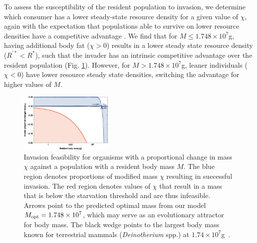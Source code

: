 \documentclass{pnastwo}
\begin{document}
\begin{article}
To assess the susceptibility of the resident population to invasion, we determine which consumer has a lower steady-state resource density for a given value of $\chi$, again with the expectation that populations able to survive on lower resource densities have a competitive advantage \cite{tilman1981}.
We find that for $M\leq 1.748\times10^7$g, having additional body fat ($\chi > 0$) results in a lower steady state resource density ($R^{\prime *}<R^*$), such that the invader has an intrinsic competitive advantage over the resident population (Fig. \ref{fig:invasion}).
However, for $M> 1.748\times10^7$g, leaner individuals ($\chi < 0$) have lower resource steady state densities, switching the advantage for higher values of $M$.



\begin{figure}
\centering
\includegraphics[width=0.4\textwidth]{fig_Invasion.eps}
\caption{\small{ Invasion feasibility for organisms with a proportional change in
  mass $\chi$ against a population with a resident body mass $M$.  The blue
  region denotes proportions of modified mass $\chi$ resulting in successful invasion.  The
  red region denotes values of $\chi$ that result in a mass that is below the
  starvation threshold and are thus infeasible.
  Arrows point to the predicted optimal mass from our model $M_{\rm opt}=1.748\times 10^7$, which may serve as an evolutionary attractor for body mass.
  The black wedge points to the largest body mass known for terrestrial mammals (\emph{Deinotherium} spp.) at $1.74\times10^7$g~\cite{Smith:2010p3442}.}\label{fig:invasion}}
\end{figure}


\end{article}
\end{document}

